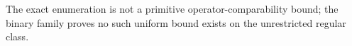 The exact enumeration is not a primitive operator-comparability bound; the binary family proves no such uniform bound exists on the unrestricted regular class.